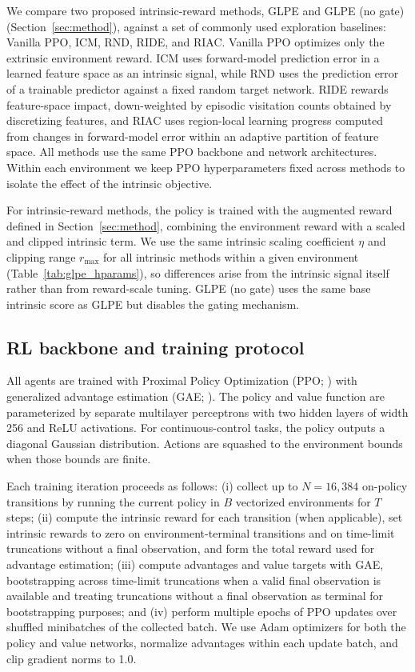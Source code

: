 We compare two proposed intrinsic-reward methods, GLPE and GLPE (no gate) (Section~\ref{sec:method}), against a set of commonly used exploration baselines: Vanilla PPO, ICM, RND, RIDE, and RIAC.
Vanilla PPO optimizes only the extrinsic environment reward.
ICM uses forward-model prediction error in a learned feature space as an intrinsic signal, while RND uses the prediction error of a trainable predictor against a fixed random target network.
RIDE rewards feature-space impact, down-weighted by episodic visitation counts obtained by discretizing features, and RIAC uses region-local learning progress computed from changes in forward-model error within an adaptive partition of feature space.
All methods use the same PPO backbone and network architectures.
Within each environment we keep PPO hyperparameters fixed across methods to isolate the effect of the intrinsic objective.

For intrinsic-reward methods, the policy is trained with the augmented reward defined in Section~\ref{sec:method}, combining the environment reward with a scaled and clipped intrinsic term.
We use the same intrinsic scaling coefficient $\eta$ and clipping range $r_{\max}$ for all intrinsic methods within a given environment (Table~\ref{tab:glpe_hparams}), so differences arise from the intrinsic signal itself rather than from reward-scale tuning.
GLPE (no gate) uses the same base intrinsic score as GLPE but disables the gating mechanism.



\subsection{RL backbone and training protocol}
\label{sec:experimental_setup:training}

All agents are trained with Proximal Policy Optimization (PPO; \cite{schulman-2017}) with generalized advantage estimation (GAE; \cite{schulman-2015}).
The policy and value function are parameterized by separate multilayer perceptrons with two hidden layers of width 256 and ReLU activations.
For continuous-control tasks, the policy outputs a diagonal Gaussian distribution.
Actions are squashed to the environment bounds when those bounds are finite.

Each training iteration proceeds as follows:
(i) collect up to $N=16{,}384$ on-policy transitions by running the current policy in $B$ vectorized environments for $T$ steps;
(ii) compute the intrinsic reward for each transition (when applicable), set intrinsic rewards to zero on environment-terminal transitions and on time-limit truncations without a final observation, and form the total reward used for advantage estimation;
(iii) compute advantages and value targets with GAE, bootstrapping across time-limit truncations when a valid final observation is available and treating truncations without a final observation as terminal for bootstrapping purposes; and
(iv) perform multiple epochs of PPO updates over shuffled minibatches of the collected batch.
We use Adam optimizers for both the policy and value networks, normalize advantages within each update batch, and clip gradient norms to 1.0.

